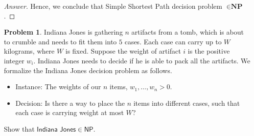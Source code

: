 \documentclass[11pt]{article}
\theoremstyle{definition}
\theoremstyle{definition}
\newtheorem{required}{Problem}
\theoremstyle{definition}
\begin{document}
\begin{proof}[Answer]
\item Hence, we conclude that Simple Shortest Path decision problem $\in \textbf{NP}$.

\end{proof}

\newpage
\begin{required} 
Indiana Jones is gathering $n$ artifacts from a tomb, which is about to crumble and needs to fit them into $5$ cases. Each case can carry up to $W$ kilograms, where $W$ is fixed. Suppose the weight of artifact $i$ is the positive integer $w_{i}$. Indiana Jones needs to decide if he is able to pack all the artifacts. We formalize the \textsf{Indiana Jones} decision problem as follows.
\begin{itemize}
\item \textsf{Instance:} The weights of our $n$ items, $w_{1}, \ldots, w_{n} > 0$. 
\item \textsf{Decision:} Is there a way to place the $n$ items into different cases, such that each case is carrying weight at most $W$?
\end{itemize}

\noindent Show that $\textsf{Indiana Jones} \in \textsf{NP}.$
\end{required}
\end{document}
